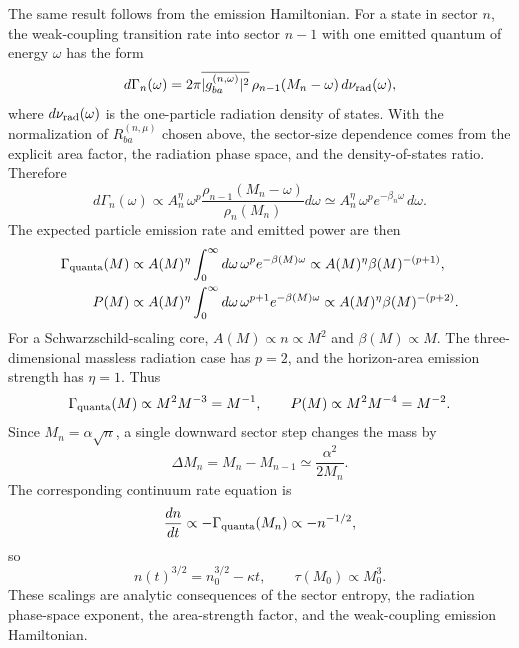 \documentclass[12pt]{article}
\begin{document}
The same result follows from the emission Hamiltonian.  For a state in sector
$n$, the weak-coupling transition rate into sector $n-1$ with one emitted
quantum of energy $\omega$ has the form
\begin{equation}
    d\Gamma_n(\omega)
    =
    2\pi
    \overline{|g^{(n,\omega)}_{ba}|^2}\,
    \rho_{n-1}(M_n-\omega)\,
    d\nu_{\rm rad}(\omega),
\end{equation}
where $d\nu_{\rm rad}(\omega)$ is the one-particle radiation density of
states.  With the normalization of $R^{(n,\mu)}_{ba}$ chosen above, the
sector-size dependence comes from the explicit area factor, the radiation
phase space, and the density-of-states ratio.  Therefore
\begin{equation}
    d\Gamma_n(\omega)
    \propto
    A_n^\eta\,\omega^p
    \frac{\rho_{n-1}(M_n-\omega)}{\rho_n(M_n)}
    d\omega
    \simeq
    A_n^\eta\,\omega^p e^{-\beta_n\omega}\,d\omega .
\end{equation}
The expected particle emission rate and emitted power are then
\begin{align}
    \Gamma_{\rm quanta}(M)
    &\propto A(M)^\eta
    \int_0^\infty d\omega\,\omega^p e^{-\beta(M)\omega}
    \propto A(M)^\eta \beta(M)^{-(p+1)},\\
    P(M)
    &\propto A(M)^\eta
    \int_0^\infty d\omega\,\omega^{p+1} e^{-\beta(M)\omega}
    \propto A(M)^\eta \beta(M)^{-(p+2)} .
\end{align}
For a Schwarzschild-scaling core, $A(M)\propto n\propto M^2$ and
$\beta(M)\propto M$.  The three-dimensional massless radiation case has
$p=2$, and the horizon-area emission strength has $\eta=1$.  Thus
\begin{equation}
    \Gamma_{\rm quanta}(M)\propto M^2 M^{-3}=M^{-1},
    \qquad
    P(M)\propto M^2 M^{-4}=M^{-2}.
\end{equation}
Since $M_n=\alpha\sqrt n$, a single downward sector step changes the mass by
\begin{equation}
    \Delta M_n=M_n-M_{n-1}\simeq \frac{\alpha^2}{2M_n}.
\end{equation}
The corresponding continuum rate equation is
\begin{equation}
    \frac{dn}{dt}\propto -\Gamma_{\rm quanta}(M_n)
    \propto -n^{-1/2},
\end{equation}
so
\begin{equation}
    n(t)^{3/2}=n_0^{3/2}-\kappa t,
    \qquad
    \tau(M_0)\propto M_0^3 .
\end{equation}
These scalings are analytic consequences of the sector entropy, the radiation
phase-space exponent, the area-strength factor, and the weak-coupling emission
Hamiltonian.
\end{document}
